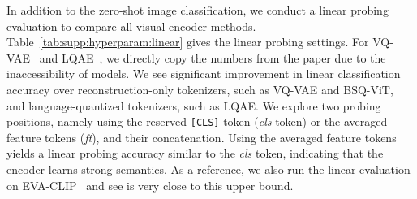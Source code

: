 In addition to the zero-shot image classification, we conduct a linear probing evaluation to compare all visual encoder methods.
Table~\ref{tab:supp:hyperparam:linear} gives the linear probing settings.
For VQ-VAE~\cite{van2017vqvae} and LQAE~\cite{liu2023lqae}, we directly copy the numbers from the paper due to the inaccessibility of models.
We see significant improvement in linear classification accuracy over reconstruction-only tokenizers, such as VQ-VAE and BSQ-ViT, and language-quantized tokenizers, such as LQAE.
We explore two probing positions, namely using the reserved \texttt{[CLS]} token (\textit{cls}-token) or the averaged feature tokens (\textit{ft}), and their concatenation.
Using the averaged feature tokens yields a linear probing accuracy similar to the \textit{cls} token, indicating that the encoder learns strong semantics.
As a reference, we also run the linear evaluation on EVA-CLIP~\cite{sun2023evaclip} and see \ours is very close to this upper bound. 







\begin{table}[!tb]
    \centering
    \caption{\textbf{Linear evaluation on image classification.}
    }
    \label{tab:supp:linear_probe}    
\end{table}


